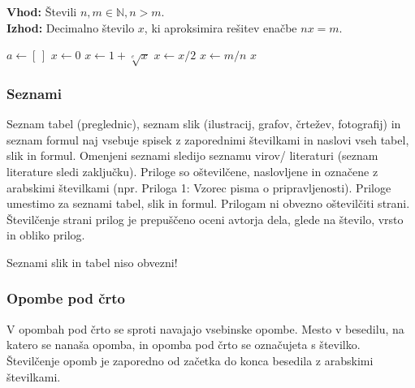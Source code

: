 \documentclass[12pt]{article}
\newcommand{\N}{\mathbb N}
\theoremstyle{definition}
\begin{document}
\begin{algorithm}[ht]
	\caption{Opis, ki ima enako funkcionalnost kot opis pod sliko.}
	\label{alg:metoda}
	\raggedright
	\textbf{Vhod:} Števili $n, m \in \N, n > m$. \\
	\textbf{Izhod:} Decimalno število $x$, ki aproksimira rešitev enačbe $n x = m$.
	\begin{algorithmic}[1]
		 
		\State $a \gets [\,]$ 
		\State {}
		\State {} 
		\Else
		\State {}
		\EndIf
		\EndFor
		\Statex  {}
		\State $x \gets 0$  
		\State $x \gets 1 + \sqrt[e]{x}$
		\EndFor
		\State $x \gets x / 2$
		\EndWhile
		\State $x \gets m / n$ \label{alg:pomembna-vrstica}
		\State \Return $x$  
		\EndFunction
	\end{algorithmic}
\end{algorithm}

\subsubsection{Seznami}

Seznam tabel (preglednic), seznam slik (ilustracij, grafov, črtežev, fotografij) in seznam formul naj vsebuje spisek z zaporednimi številkami in naslovi vseh tabel, slik in formul. Omenjeni seznami sledijo seznamu virov/ literaturi (seznam literature sledi zaključku).
Priloge so oštevilčene, naslovljene in označene z arabskimi številkami (npr. Priloga 1: Vzorec pisma o pripravljenosti). Priloge umestimo za seznami tabel, slik in formul. Prilogam ni obvezno oštevilčiti strani. Številčenje strani prilog je prepuščeno oceni avtorja dela, glede na število, vrsto in obliko prilog.

Seznami slik in tabel niso obvezni!


\subsubsection{Opombe pod črto}

V opombah pod črto se sproti navajajo vsebinske opombe. Mesto v besedilu, na katero se nanaša opomba, in opomba pod črto se označujeta s številko. Številčenje opomb je zaporedno od začetka do konca besedila z arabskimi številkami.
\end{document}
